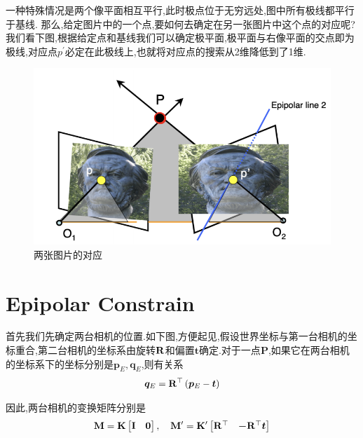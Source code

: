 一种特殊情况是两个像平面相互平行,此时极点位于无穷远处,图中所有极线都平行于基线.
那么,给定图片中的一个点,要如何去确定在另一张图片中这个点的对应呢?我们看下图,根据给定点和基线我们可以确定极平面,极平面与右像平面的交点即为极线,对应点$p^\prime$必定在此极线上,也就将对应点的搜索从2维降低到了1维.
\begin{figure}[htbp]
	\centering
	\includegraphics[scale=0.45]{figures/epi-geo-2pic.png}
	\caption{两张图片的对应}
\end{figure}

\section{Epipolar Constrain}
首先我们先确定两台相机的位置.如下图,方便起见,假设世界坐标与第一台相机的坐标重合,第二台相机的坐标系由旋转$\bold{R}$和偏置$\bm t$确定.对于一点$\bm P$,如果它在两台相机的坐标系下的坐标分别是$\bm p_E, \bm q_E$,则有关系
\begin{equation}
	\bm q_E = \bold{R}^{\top}\left( \bm p_E - \bm t\right)
\end{equation}

因此,两台相机的变换矩阵分别是
\begin{equation}
	\bold{M} = \bold{K}
	\begin{bmatrix}
		\bold{I} & \bm 0
	\end{bmatrix} ,
	\quad
	\bold{M}^\prime = \bold{K}^\prime
	\begin{bmatrix}
		\bold{R}^{\top} & \bm -\bold{R}^{\top} \bm t
	\end{bmatrix}
\end{equation}


